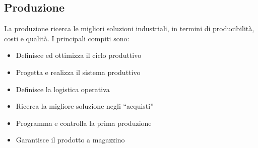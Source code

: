 \subsection{Produzione}
La produzione ricerca le migliori soluzioni industriali, in termini di producibilità, costi e qualità.
I principali compiti sono:
\begin{itemize}
	\item Definisce ed ottimizza il ciclo produttivo
	\item Progetta e realizza il sistema produttivo
	\item Definisce la logistica operativa
	\item Ricerca la migliore soluzione negli “acquisti” 
	\item Programma e controlla la prima produzione
	\item Garantisce il prodotto a magazzino
\end{itemize}